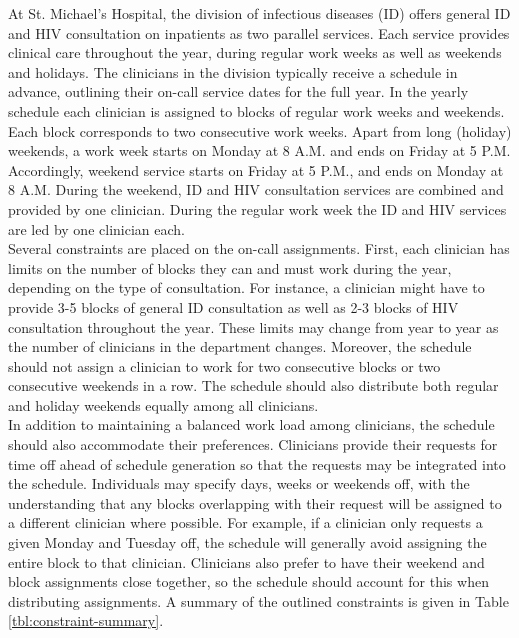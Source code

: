 At St. Michael's Hospital, the division of infectious diseases (ID) offers
general ID and HIV consultation on inpatients as two parallel services. Each
service provides clinical care throughout the year, during regular work weeks as
well as weekends and holidays. The clinicians in the division typically receive
a schedule in advance, outlining their on-call service dates for the full year.
In the yearly schedule each clinician is assigned to blocks of regular work
weeks and weekends. Each block corresponds to two consecutive work weeks. Apart
from long (holiday) weekends, a work week starts on Monday at 8 A.M. and ends on
Friday at 5 P.M. Accordingly, weekend service starts on Friday at 5 P.M., and
ends on Monday at 8 A.M. During the weekend, ID and HIV consultation services
are combined and provided by one clinician. During the regular work week the ID
and HIV services are led by one clinician each. \\

Several constraints are placed on the on-call assignments. First, each clinician
has limits on the number of blocks they can and must work during the year,
depending on the type of consultation. For instance, a clinician might have to
provide 3-5 blocks of general ID consultation as well as 2-3 blocks of HIV
consultation throughout the year. These limits may change from year to year as
the number of clinicians in the department changes. Moreover, the schedule
should not assign a clinician to work for two consecutive blocks or two
consecutive weekends in a row. The schedule should also distribute both regular
and holiday weekends equally among all clinicians. \\

In addition to maintaining a balanced work load among clinicians, the schedule
should also accommodate their preferences. Clinicians provide their requests for
time off ahead of schedule generation so that the requests may be integrated
into the schedule. Individuals may specify days, weeks or weekends off, with the
understanding that any blocks overlapping with their request will be assigned to
a different clinician where possible. For example, if a clinician only requests
a given Monday and Tuesday off, the schedule will generally avoid assigning the
entire block to that clinician. Clinicians also prefer to have their weekend and
block assignments close together, so the schedule should account for this when
distributing assignments. A summary of the outlined constraints is given in
Table \ref{tbl:constraint-summary}.

